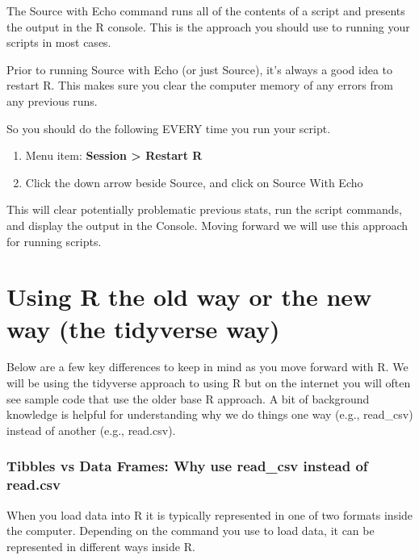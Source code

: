\documentclass[
]{krantz}
\providecommand{\tightlist}{%
  \setlength{\itemsep}{0pt}\setlength{\parskip}{0pt}}
\begin{document}
The Source with Echo command runs all of the contents of a script and presents the output in the R console. This is the approach you should use to running your scripts in most cases.

Prior to running Source with Echo (or just Source), it's always a good idea to restart R. This makes sure you clear the computer memory of any errors from any previous runs.

So you should do the following EVERY time you run your script.

\begin{enumerate}
\def\labelenumi{\arabic{enumi}.}
\tightlist
\item
  Menu item: \textbf{Session \textgreater{} Restart R}
\item
  Click the down arrow beside Source, and click on Source With Echo
\end{enumerate}

This will clear potentially problematic previous stats, run the script commands, and display the output in the Console. Moving forward we will use this approach for running scripts.

\hypertarget{using-r-the-old-way-or-the-new-way-the-tidyverse-way}{%
\section{Using R the old way or the new way (the tidyverse way)}\label{using-r-the-old-way-or-the-new-way-the-tidyverse-way}}

Below are a few key differences to keep in mind as you move forward with R. We will be using the tidyverse approach to using R but on the internet you will often see sample code that use the older base R approach. A bit of background knowledge is helpful for understanding why we do things one way (e.g., read\_csv) instead of another (e.g., read.csv).

\hypertarget{tibbles-vs-data-frames-why-use-read_csv-instead-of-read.csv}{%
\subsubsection{Tibbles vs Data Frames: Why use read\_csv instead of read.csv}\label{tibbles-vs-data-frames-why-use-read_csv-instead-of-read.csv}}

When you load data into R it is typically represented in one of two formats inside the computer. Depending on the command you use to load data, it can be represented in different ways inside R.
\end{document}
